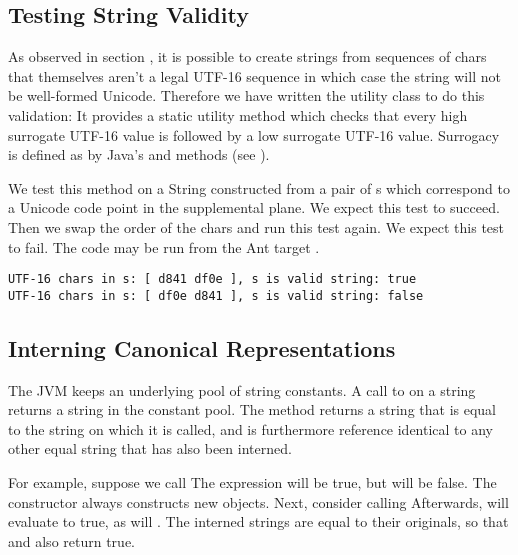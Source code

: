 \subsection{Testing String Validity}\label{section:valid-utf16}

As observed in section , it is possible
to create strings from sequences of chars that themselves aren't a legal UTF-16 sequence
in which case the string will not be well-formed Unicode.
Therefore we have written the utility class
 to do this validation:
%
%
%
It provides a static utility method  
which checks that every
high surrogate UTF-16  value is followed by a low surrogate
UTF-16 value.  Surrogacy is defined as by Java's
 and
 methods (see ).

We test this method on a String constructed from
a pair of s which correspond to
a Unicode code point in the supplemental plane.
%
%
We expect this test to succeed.
Then we swap the order of the chars and run this test again.
%
%
We expect this test to fail.
The code may be run from the Ant target . 
%
%
\begin{verbatim}
UTF-16 chars in s: [ d841 df0e ], s is valid string: true
UTF-16 chars in s: [ df0e d841 ], s is valid string: false
\end{verbatim}


\subsection{Interning Canonical Representations}\label{section:string-intern}

The JVM keeps an underlying pool of string constants.  A call to
 on a string returns a string in the constant pool.
The method  returns a string that is equal to the
string on which it is called, and is furthermore reference identical
to any other equal string that has also been interned.

For example,  suppose we call
%
%
The expression  will be true, but
 will be false.  The constructor  always
constructs new objects.  Next, consider calling
%
%
Afterwards,  will evaluate to true, as will
.  The interned strings are equal to their
originals, so that  and  also
return true.


